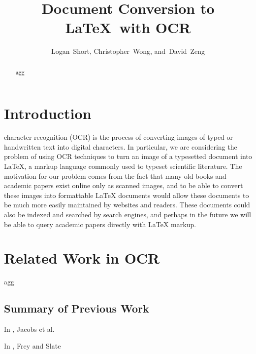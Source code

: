 \documentclass[12pt]{IEEEtran}
\newcommand{\latex}{\LaTeX\xspace}
\begin{document}
\title{Document Conversion to \latex\ with OCR}
\author{Logan~Short, Christopher~Wong, and~David~Zeng}%
\maketitle

\begin{abstract}
agg
\end{abstract}

\section{Introduction}

 character recognition (OCR) is the process of converting images of typed or handwritten text into digital characters. In particular, we are considering the problem of using OCR techniques to turn an image of a typesetted document into \latex, a markup language commonly used to typeset scientific literature. The motivation for our problem comes from the fact that many old books and academic papers exist online only as scanned images, and to be able to convert these images into formattable \latex documents would allow these documents to be much more easily maintained by websites and readers. These documents could also be indexed and searched by search engines, and perhaps in the future we will be able to query academic papers directly with \latex markup.

\section{Related Work in OCR}

agg

\subsection{Summary of Previous Work}

In \cite{1}, Jacobs et al.

In \cite{2}, Frey and Slate
\end{document}
